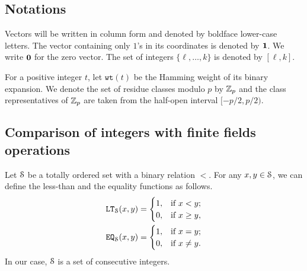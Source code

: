 \subsection{Notations}
  Vectors will be written in column form and denoted by boldface lower-case letters. The vector containing only $1$'s in its coordinates is denoted by $\1$. We write $\0$ for the zero vector. The set of integers $\{\ell,\dots,k\}$ is denoted by $[\ell,k]$.

  For a positive integer $t$, let $\texttt{wt}(t)$ be the Hamming weight of its binary expansion. We denote the set of residue classes modulo $p$ by $\Z_p$ and the class representatives of $\Z_p$ are taken from the half-open interval $[-p/2, p/2)$.

\subsection{Comparison of integers with finite fields operations}
  Let $\S$ be a totally ordered set with a binary relation $<$.
  For any $x,y \in \S$, we can define the less-than and the equality functions as follows.
  \begin{align*}
    \LT_\S(x,y) = 
    \begin{cases}
      1, & \text{if } x < y; \\
      0, & \text{if } x \ge y, \\
    \end{cases}
    \\
    \EQ_\S(x,y) = 
    \begin{cases}
      1, & \text{if } x = y; \\
      0, & \text{if } x \neq y. \\
    \end{cases}
  \end{align*}
  In our case, $\S$ is a set of consecutive integers.

